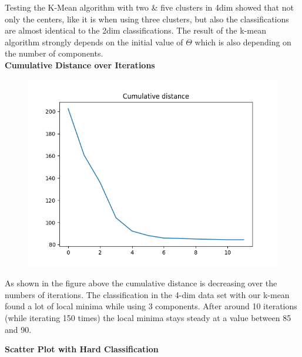 \documentclass[a4paper]{article}
\begin{document}
\noindent
Testing the K-Mean algorithm with two \& five clusters in 4dim showed that not only the centers, like it is when using three clusters, but also the classifications are almost identical to the 2dim classifications. The result of the k-mean algorithm strongly depends on the initial value of $\Theta$ which is also depending on the number of components. \\

\noindent
{\large \textbf{Cumulative Distance over Iterations}} \\


\begin{figure}[htp]
\centering
\includegraphics[scale=0.5]{plots/CC_scenario2_cmpnt3.png}
  \label{fig:17}
\end{figure}

\noindent
As shown in the figure above the cumulative distance is decreasing over the numbers of iterations. The classification in the 4-dim data set with our k-mean found a lot of local minima while using 3 components. After around 10 iterations (while iterating 150 times) the local minima stays steady at a value between 85 and 90. \newline \newline

\newpage
{\large \textbf{Scatter Plot with Hard Classification}} \\

\end{document}
